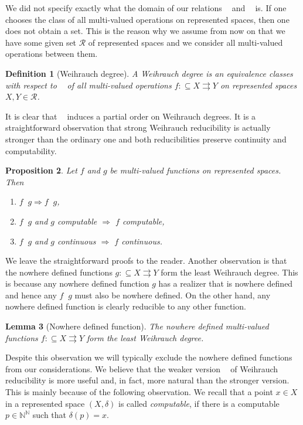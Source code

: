 \documentclass[jsl,10pt]{noasl}
\def\RR{{\mathcal R}}
\def\IN{{\mathbb{N}}}
\def\TO{\Longrightarrow}
\def\In{\subseteq}
\def\mto{\rightrightarrows}
\def\leqW{\mathop{\leq_{\mathrm{W}}}}
\def\equivW{\mathop{\equiv_{\mathrm{W}}}}
\def\leqSW{\mathop{\leq_{\mathrm{sW}}}}
\newtheorem{proposition}{Proposition}[section]
\newtheorem{lemma}[proposition]{Lemma}
\newtheorem{definition}[proposition]{Definition}
\begin{document}
We did not specify exactly what the domain of our relations $\leqW$
and $\leqSW$ is. If one chooses the class of all multi-valued operations
on represented spaces, then one does not obtain a set. 
This is the reason why we assume from now on that we have some given
set $\RR$ of represented spaces and we consider all multi-valued operations
between them. 

\begin{definition}[Weihrauch degree]\rm
A {\em Weihrauch degree} is an equivalence classes with respect to 
$\equivW$ of all multi-valued operations $f:\In X\mto Y$ on
represented spaces $X,Y\in\RR$. 
\end{definition}

It is clear that $\leqW$ induces a partial order on Weihrauch degrees.
It is a straightforward observation that strong Weihrauch reducibility
is actually stronger than the ordinary one and both reducibilities 
preserve continuity and computability.

\begin{proposition}
\label{prop:reducibility-computability}
Let $f$ and $g$ be multi-valued functions on represented spaces. Then 
\begin{enumerate}
\item $f\leqSW g\TO f\leqW g$,
\item $f\leqW g$ and $g$ computable $\TO$ $f$ computable,
\item $f\leqW g$ and $g$ continuous $\TO$ $f$ continuous.
\end{enumerate}
\end{proposition}

We leave the straightforward proofs to the reader.
Another observation is that the nowhere defined functions $g:\In X\mto Y$ form
the least Weihrauch degree. This is because any nowhere defined function $g$
has a realizer that is nowhere defined and hence any $f\leqW g$ must also be nowhere
defined. On the other hand, any nowhere defined function is clearly reducible
to any other function.

\begin{lemma}[Nowhere defined function]
\label{lem:nowhere}
The nowhere defined multi-val\-ued functions $f:\In X\mto Y$ form the
least Weihrauch degree.
\end{lemma}

Despite this observation we will typically exclude the nowhere defined functions
from our considerations.
We believe that the weaker version $\leqW$ of Weihrauch reducibility
is more useful and, in fact, more natural than the stronger version. 
This is mainly because of the following observation. We recall that 
a point $x\in X$ in a represented space $(X,\delta)$ is called {\em computable},
if there is a computable $p\in\IN^\IN$ such that $\delta(p)=x$.
\end{document}
